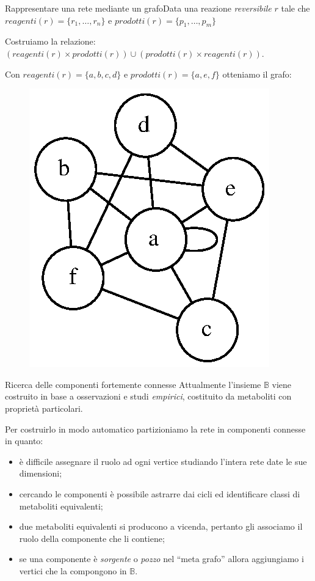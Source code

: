 \documentclass{beamer}
\begin{document}
\begin{frame}{Rappresentare una rete mediante un grafo}{Data una
    reazione \emph{reversibile} $r$ tale che $reagenti(r) = \{ r_{1},
    \ldots, r_{n} \}$ e $prodotti(r) = \{ p_{1}, \ldots, p_{m} \}$}

  Costruiamo la relazione: $(reagenti(r) \times prodotti(r)) \cup
  (prodotti(r) \times reagenti(r))$.
  
    \begin{example}
      Con $reagenti(r) = \{ a, b, c, d \}$ e $prodotti(r) = \{a, e,
      f\}$ otteniamo il grafo:
      \begin{figure}
        \centering
        \includegraphics[scale=.6]{images/reversible-reaction-example.dot.eps}
        \label{fig:reversible-reaction-mapping}
      \end{figure}
    \end{example}
\end{frame}

\begin{frame}{Ricerca delle componenti fortemente connesse}
  Attualmente l'insieme $\mathbb{B}$ viene costruito in base a
  osservazioni e studi \emph{empirici}, costituito da metaboliti con
  propriet\`a particolari.

  Per costruirlo in modo automatico partizioniamo la rete in
  componenti connesse in quanto:
\begin{itemize}
\item<2-> \`e difficile assegnare il ruolo ad ogni vertice studiando
  l'intera rete date le sue dimensioni;
\item<3-> cercando le componenti \`e possibile astrarre dai cicli ed
  identificare classi di metaboliti equivalenti;
\item<4-> due metaboliti equivalenti si producono a vicenda, pertanto
  gli associamo il ruolo della componente che li contiene;
\item<5-> se una componente \`e \emph{sorgente} o \emph{pozzo} nel
  ``meta grafo'' allora aggiungiamo i vertici che la compongono in
  $\mathbb{B}$.
\end{itemize}
\end{frame}
\end{document}
